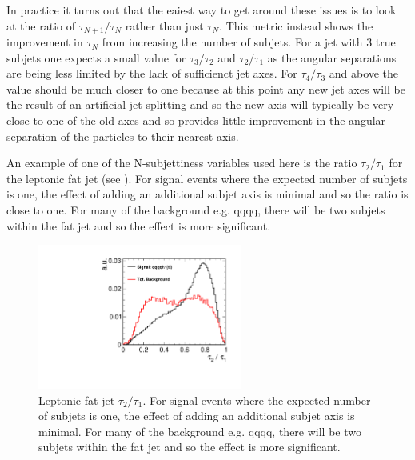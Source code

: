 In practice it turns out that the eaiest way to get around these issues is to look at the ratio of $\tau_{N+1}/\tau_N$ rather than just $\tau_N$. This metric instead shows the improvement in $\tau_N$ from increasing the number of subjets. For a jet with 3 true subjets one expects a small value for $\tau_{3}/\tau_2$ and $\tau_{2}/\tau_1$ as the angular separations are being less limited by the lack of sufficienct jet axes. For $\tau_{4}/\tau_3$ and above the value should be much closer to one because at this point any new jet axes will be the result of an artificial jet splitting and so the new axis will typically be very close to one of the old axes and so provides little improvement in the angular separation of the particles to their nearest axis.

An example of one of the N-subjettiness variables used here is the ratio $\tau_{2}/\tau_1$ for the leptonic fat jet (see ). For signal events where the expected number of subjets is one, the effect of adding an additional subjet axis is minimal and so the ratio is close to one. For many of the background e.g. qqqq, there will be two subjets within the fat jet and so the effect is more significant.

\begin{figure}
  \centering
  \includegraphics[width=0.6\textwidth]{TopAnalysis/figures/NSubJettiness.pdf}
  \caption[Leptonic fat jet $\tau_{2}/\tau_1$]{Leptonic fat jet $\tau_{2}/\tau_1$. For signal events where the expected number of subjets is one, the effect of adding an additional subjet axis is minimal. For many of the background e.g. qqqq, there will be two subjets within the fat jet and so the effect is more significant.}
  \label{fig:lepfatjetsubjet}
\end{figure}

  
